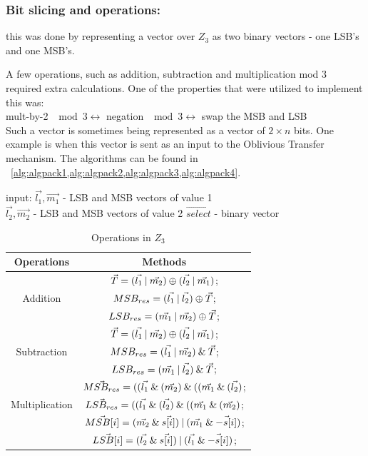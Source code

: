 \subsubsection{Bit slicing and operations:} this was done by representing a vector over $Z_3$  as two binary vectors - one LSB's and one MSB's. 

A few operations, such as addition, subtraction and multiplication mod 3 required extra calculations. One of the properties that were utilized to implement this was:\\
mult-by-2 $\mod 3  \leftrightarrow$ negation $ \mod 3 \leftrightarrow$ swap the MSB and LSB\\

Such a vector is sometimes being represented as a vector of $2 \times n$ bits. One example is when this vector is sent as an input to the Oblivious Transfer mechanism. 
The algorithms can be found in ~\cref{alg:algpack1,alg:algpack2,alg:algpack3,alg:algpack4}.


input:   $\vec{l_1}, \vec{m_1}$ - LSB and MSB vectors of value 1  \\
					$\vec{l_2}, \vec{m_2}$ - LSB and MSB vectors of value 2
					$\vec{select}$ - binary vector

\begin{table}[ht]
\caption{Operations in $Z_3$}
\begin{center}
\begin{tabular}{|c|c|}
    \hline
    \textbf{Operations} & \textbf{Methods}\\
    \hline
    \multirow{3}{*}{Addition} & $\vec{T} = (\vec{l_1} \mathbin{|} \vec{m_2}) \oplus (\vec{l_2} \mathbin{|} \vec{m_1})$;\\
    & $MSB_{res} = ( \vec{l_1} \mathbin{|} \vec{l_2} ) \oplus  \vec{T} $; \\
    & $LSB_{res} = (\vec{m_1} \mathbin{|} \vec{m_2} ) \oplus \vec{T} $; \\
    \hline
    \multirow{3}{*}{Subtraction} & $\vec{T} = (\vec{l_1} \mathbin{|} \vec{m_2}) \oplus (\vec{l_2} \mathbin{|} \vec{m_1})$;\\
    & $MSB_{res} = (\vec{l_1} \mathbin{|} \vec{m_2} ) \mathbin{\&} \vec{T}$;\\
    & $LSB_{res} = (\vec{m_1} \mathbin{|} \vec{l_2} ) \mathbin{\&} \vec{T}$; \\
    \hline
\multirow{3}{*}{Multiplication} & $\vec{MSB_{res}}= ((\vec{l_1} \mathbin{\&} (\vec{m_2}) \mathbin{\&}     ((\vec{m_1} \mathbin{\&} (\vec{l_2})$; \\
    & $\vec{LSB_{res}} = ((\vec{l_1} \mathbin{\&} (\vec{l_2}) \mathbin{\&}     ((\vec{m_1} \mathbin{\&} (\vec{m_2})$;\\
    \hline
\multirow{3}{*}{MUX} & $\vec{MSB[i]} =( \vec{m_2} \mathbin{\&} \vec{s[i]}) \mathbin{|} (\vec{m_1} \mathbin{\&} \vec{- s[i]})$; \\
    & $\vec{LSB[i]} =( \vec{l_2} \mathbin{\&} \vec{s[i]}) \mathbin{|} (\vec{l_1} \mathbin{\&} \vec{- s[i]})$; \\
    \hline

\end{tabular}
\end{center}
\label{tab:multicol}
\end{table}


